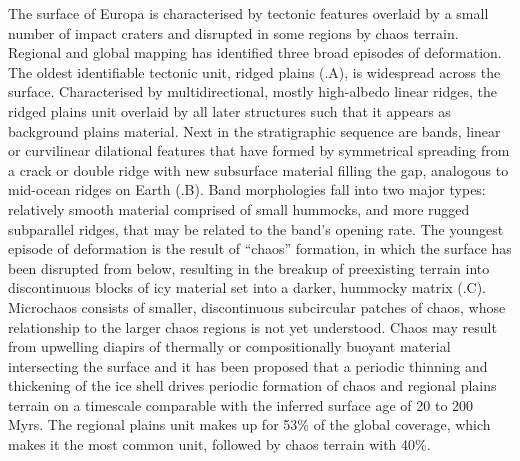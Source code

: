 The surface of Europa is characterised by tectonic features overlaid by a small number of impact craters and disrupted in some regions by chaos terrain. Regional and global mapping has identified three broad episodes of deformation. The oldest identifiable tectonic unit, ridged plains (.A), is widespread across the surface. Characterised by multidirectional, mostly high-albedo linear ridges, the ridged plains unit overlaid by all later structures such that it appears as background plains material. Next in the stratigraphic sequence are bands, linear or curvilinear dilational features that have formed by symmetrical spreading from a crack or double ridge with new subsurface material filling the gap, analogous to mid-ocean ridges on Earth (.B). Band morphologies fall into two major types: relatively smooth material comprised of small hummocks, and more rugged subparallel ridges, that may be related to the band’s opening rate. The youngest episode of deformation is the result of ``chaos'' formation, in which the surface has been disrupted from below, resulting in the breakup of preexisting terrain into discontinuous blocks of icy material set into a darker, hummocky matrix (.C). Microchaos consists of smaller, discontinuous subcircular patches of chaos, whose relationship to the larger chaos regions is not yet understood. Chaos may result from upwelling diapirs of thermally or compositionally buoyant material intersecting the surface and it has been proposed that a periodic thinning and thickening of the ice shell drives periodic formation of chaos and regional plains terrain on a timescale comparable with the inferred surface age of 20 to 200 Myrs. The regional plains unit makes up for 53\% of the global coverage, which makes it the most common unit, followed by chaos terrain with 40\%. 

